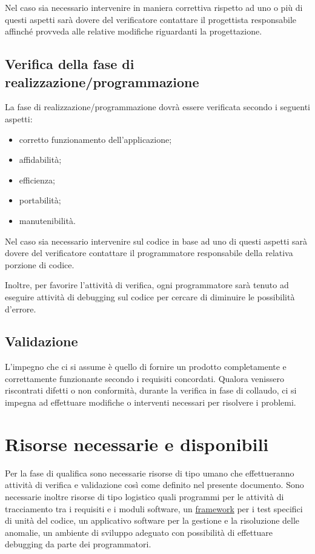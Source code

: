 Nel caso sia necessario intervenire in maniera correttiva rispetto ad uno o
pi\`u di questi aspetti sar\`a dovere del verificatore contattare il progettista
responsabile affinch\'e provveda alle relative modifiche riguardanti la progettazione.

\subsection{Verifica della fase di realizzazione/programmazione}

La fase di realizzazione/programmazione dovr\`a essere verificata secondo i seguenti aspetti:
\begin{itemize}
\item corretto funzionamento dell'applicazione;
\item affidabilit\`a;
\item efficienza;
\item portabilit\`a;
\item manutenibilit\`a.

\end{itemize}

Nel caso sia necessario intervenire sul codice in base ad uno di questi aspetti
sar\`a dovere del verificatore contattare il programmatore responsabile della
relativa porzione di codice.

Inoltre, per favorire l'attivit\`a di verifica, ogni programmatore sar\`a tenuto
ad eseguire attivit\`a di debugging sul codice per cercare di diminuire le
possibilit\`a d'errore.

\subsection{Validazione}

L'impegno che ci si assume \`e quello di fornire un prodotto completamente e
correttamente funzionante secondo i requisiti concordati. Qualora venissero
riscontrati difetti o non conformit\`a, durante la verifica in fase di collaudo,
ci si impegna ad effettuare modifiche o interventi necessari per risolvere i
problemi.

\section{Risorse necessarie e disponibili}

Per la fase di qualifica sono necessarie risorse di tipo umano che
effettueranno attivit\`a di verifica e validazione cos\`i come definito nel
presente documento. Sono necessarie inoltre risorse di tipo logistico quali
programmi per le attivit\`a di tracciamento tra i requisiti e i moduli software,
un \underline{framework} per i test specifici di unit\`a del codice, un
applicativo software per la gestione e la risoluzione delle anomalie, un ambiente di sviluppo
adeguato con possibilit\`a di effettuare debugging da parte dei programmatori.


